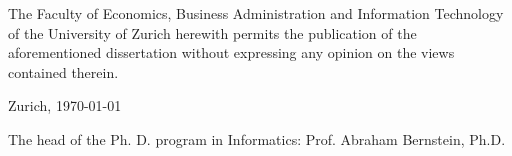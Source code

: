 

\begin{titlepage}

\setlength{\parindent}{0pt} %

\normalsize
The Faculty of Economics, Business Administration and Information Technology of the University of Zurich herewith permits the publication of the aforementioned dissertation without expressing any opinion on the views contained therein.

\vspace{1cm}
Zurich, \today

\vspace{2cm}
The head of the Ph. D. program in Informatics: Prof. Abraham Bernstein, Ph.D.
%
\newpage
\thispagestyle{empty}
\quad
\newpage
\setcounter{page}{1}

\end{titlepage}
